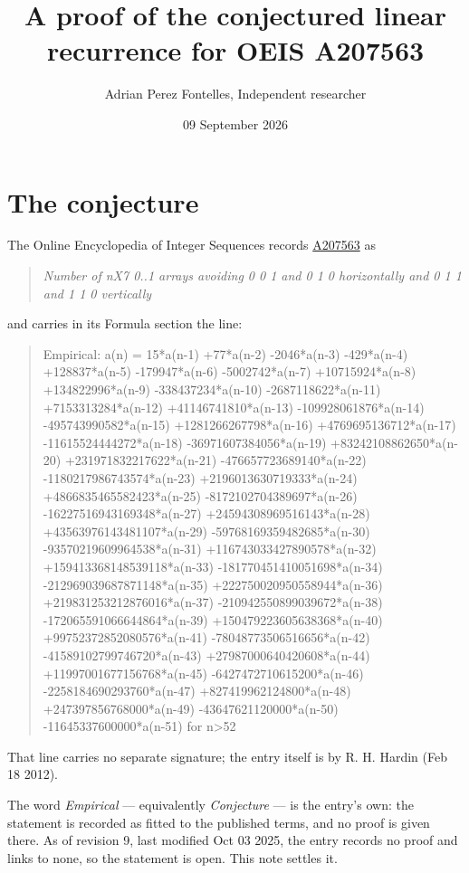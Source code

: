 \documentclass[11pt]{article}
\title{A proof of the conjectured linear recurrence for OEIS A207563}
\author{Adrian Perez Fontelles, Independent researcher}
\date{09 September 2026}
\theoremstyle{definition}
\begin{document}
\maketitle
\section{The conjecture}

The Online Encyclopedia of Integer Sequences records \href{https://oeis.org/A207563}{A207563} as

\begin{quote}\itshape Number of nX7 0..1 arrays avoiding 0 0 1 and 0 1 0 horizontally and 0 1 1 and 1 1 0 vertically\end{quote}

and carries in its Formula section the line:

\begin{quote}\ttfamily Empirical: a(n) = 15*a(n-1) +77*a(n-2) -2046*a(n-3) -429*a(n-4) +128837*a(n-5) -179947*a(n-6) -5002742*a(n-7) +10715924*a(n-8) +134822996*a(n-9) -338437234*a(n-10) -2687118622*a(n-11) +7153313284*a(n-12) +41146741810*a(n-13) -109928061876*a(n-14) -495743990582*a(n-15) +1281266267798*a(n-16) +4769695136712*a(n-17) -11615524444272*a(n-18) -36971607384056*a(n-19) +83242108862650*a(n-20) +231971832217622*a(n-21) -476657723689140*a(n-22) -1180217986743574*a(n-23) +2196013630719333*a(n-24) +4866835465582423*a(n-25) -8172102704389697*a(n-26) -16227516943169348*a(n-27) +24594308969516143*a(n-28) +43563976143481107*a(n-29) -59768169359482685*a(n-30) -93570219609964538*a(n-31) +116743033427890578*a(n-32) +159413368148539118*a(n-33) -181770451410051698*a(n-34) -212969039687871148*a(n-35) +222750020950558944*a(n-36) +219831253212876016*a(n-37) -210942550899039672*a(n-38) -172065591066644864*a(n-39) +150479223605638368*a(n-40) +99752372852080576*a(n-41) -78048773506516656*a(n-42) -41589102799746720*a(n-43) +27987000640420608*a(n-44) +11997001677156768*a(n-45) -6427472710615200*a(n-46) -2258184690293760*a(n-47) +827419962124800*a(n-48) +247397856768000*a(n-49) -43647621120000*a(n-50) -11645337600000*a(n-51) for n>52\end{quote}

That line carries no separate signature; the entry itself is by R. H. Hardin (Feb 18 2012).

The word {\itshape Empirical} --- equivalently {\itshape Conjecture} --- is the entry's own: the statement is recorded as fitted to the published terms, and no proof is given there. As of revision 9, last modified Oct 03 2025, the entry records no proof and links to none, so the statement is open. This note settles it.
\end{document}
